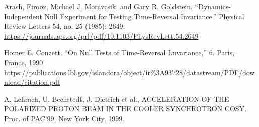 \documentclass[14pt]{extarticle}
\newcommand{\SrcNm}[1]{\textsc{#1}}
\begin{document}
\begin{thebibliography}{9}
Arash, Firooz, Michael J. Moravcsik, and Gary R. Goldstein. “Dynamics-Independent Null Experiment for Testing Time-Reversal Invariance.” Physical Review Letters 54, no. 25 (1985): 2649.
\url{https://journals.aps.org/prl/pdf/10.1103/PhysRevLett.54.2649}

Homer E. Conzett. “On Null Tests of Time-Reversal Lnvariance,” 6. Paris, France, 1990. \url{https://publications.lbl.gov/islandora/object/ir%3A93728/datastream/PDF/download/citation.pdf}


A. Lehrach, U. Bechstedt, J. Dietrich et al.,
\SrcNm{ACCELERATION OF THE POLARIZED PROTON BEAM IN THE
COOLER SYNCHROTRON COSY}.
Proc. of PAC'99, New York City, 
1999.

%
%
%
%
%
%
%
%

\end{thebibliography}
\end{document}
